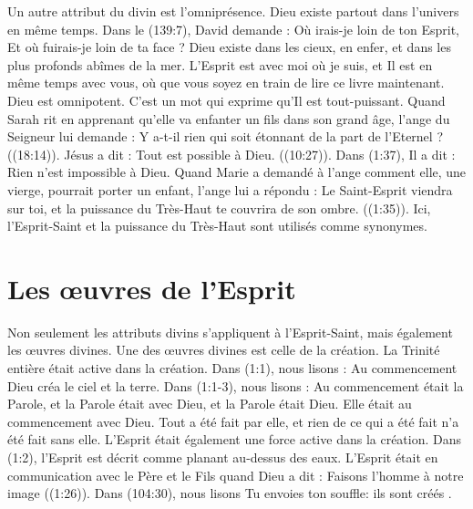 Un autre attribut du divin est l'omniprésence. Dieu existe partout dans l'univers en même temps. Dans le (139:7), David demande : \og Où irais-je loin de ton Esprit, Et où fuirais-je loin de ta face ? \fg{} Dieu existe dans les cieux, en enfer, et dans les plus profonds abîmes de la mer. L'Esprit est avec moi où je suis, et Il est en même temps avec vous, où que vous soyez en train de lire ce livre maintenant. Dieu est omnipotent. C'est un mot qui exprime qu'Il est tout-puissant. Quand Sarah rit en apprenant qu'elle va enfanter un fils dans son grand âge, l'ange du Seigneur lui demande : \og Y a-t-il rien qui soit étonnant de la part de l'Eternel ? \fg{} ((18:14)). Jésus a dit : \og Tout est possible à Dieu. \fg{} ((10:27)). Dans (1:37), Il a dit : \og Rien n'est impossible à Dieu. \fg{} Quand Marie a demandé à l'ange comment elle, une vierge, pourrait porter un enfant, l'ange lui a répondu : \og Le Saint-Esprit viendra sur toi, et la puissance du Très-Haut te couvrira de son ombre. \fg{} ((1:35)). Ici, l'Esprit-Saint et la puissance du Très-Haut sont utilisés comme synonymes.

\section{Les œuvres de l'Esprit}


Non seulement les attributs divins s'appliquent à l'Esprit-Saint, mais également les œuvres divines. Une des œuvres divines est celle de la création. La Trinité entière était active dans la création. Dans (1:1), nous lisons : \og Au commencement Dieu créa le ciel et la terre. \fg{} Dans (1:1-3), nous lisons : \og Au commencement était la Parole, et la Parole était avec Dieu, et la Parole était Dieu. Elle était au commencement avec Dieu. Tout a été fait par elle, et rien de ce qui a été fait n'a été fait sans elle. \fg{} L'Esprit était également une force active dans la création. Dans (1:2), l'Esprit est décrit comme planant au-dessus des eaux. L'Esprit était en communication avec le Père et le Fils quand Dieu a dit : \og Faisons l'homme à notre image \fg{} ((1:26)). Dans (104:30), nous lisons \og Tu envoies ton souffle: ils sont créés \fg{} .

